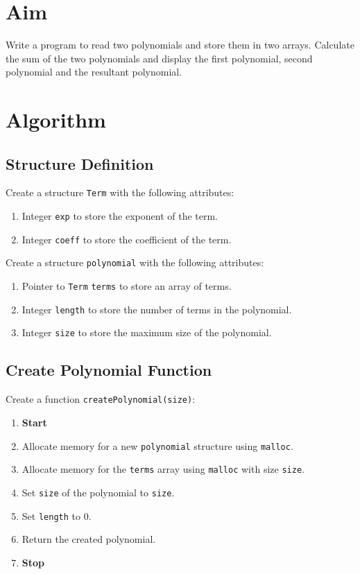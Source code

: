 
\section{Aim}
Write a program to read two polynomials and store them in two arrays. Calculate the sum of
the two polynomials and display the first polynomial, second polynomial and the resultant
polynomial.

\section{Algorithm}
 {\selectfont

  \subsection{Structure Definition}
  Create a structure \texttt{Term} with the following attributes:
  \begin{enumerate}[label=\arabic*:,left=0pt]
    \item Integer \texttt{exp} to store the exponent of the term.
    \item Integer \texttt{coeff} to store the coefficient of the term.
  \end{enumerate}

  Create a structure \texttt{polynomial} with the following attributes:
  \begin{enumerate}[label=\arabic*:,left=0pt]
    \item Pointer to \texttt{Term} \texttt{terms} to store an array of terms.
    \item Integer \texttt{length} to store the number of terms in the polynomial.
    \item Integer \texttt{size} to store the maximum size of the polynomial.
  \end{enumerate}

  \subsection{Create Polynomial Function}
  Create a function \texttt{createPolynomial(size)}:
  \begin{enumerate}[label=\arabic*:,left=0pt]
    \item \textbf{Start}
    \item Allocate memory for a new \texttt{polynomial} structure using \texttt{malloc}.
    \item Allocate memory for the \texttt{terms} array using \texttt{malloc} with size \texttt{size}.
    \item Set \texttt{size} of the polynomial to \texttt{size}.
    \item Set \texttt{length} to 0.
    \item Return the created polynomial.
    \item \textbf{Stop}
  \end{enumerate}

}
